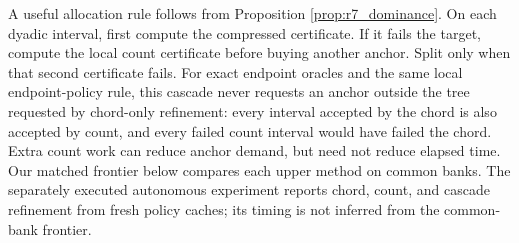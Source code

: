 A useful allocation rule follows from Proposition \ref{prop:r7_dominance}. On each dyadic interval, first compute the compressed certificate. If it fails the target, compute the local count certificate before buying another anchor. Split only when that second certificate fails. For exact endpoint oracles and the same local endpoint-policy rule, this cascade never requests an anchor outside the tree requested by chord-only refinement: every interval accepted by the chord is also accepted by count, and every failed count interval would have failed the chord. Extra count work can reduce anchor demand, but need not reduce elapsed time. Our matched frontier below compares each upper method on common banks. The separately executed autonomous experiment reports chord, count, and cascade refinement from fresh policy caches; its timing is not inferred from the common-bank frontier.
